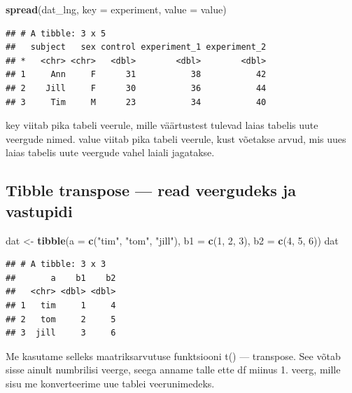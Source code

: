 \documentclass[]{book}
\newenvironment{Shaded}{\begin{snugshade}}{\end{snugshade}}
\newcommand{\KeywordTok}[1]{\textcolor[rgb]{0.13,0.29,0.53}{\textbf{#1}}}
\newcommand{\DataTypeTok}[1]{\textcolor[rgb]{0.13,0.29,0.53}{#1}}
\newcommand{\DecValTok}[1]{\textcolor[rgb]{0.00,0.00,0.81}{#1}}
\newcommand{\StringTok}[1]{\textcolor[rgb]{0.31,0.60,0.02}{#1}}
\newcommand{\NormalTok}[1]{#1}
\begin{document}
\begin{Shaded}
\begin{Highlighting}[]
\KeywordTok{spread}\NormalTok{(dat_lng, }\DataTypeTok{key =}\NormalTok{ experiment, }\DataTypeTok{value =}\NormalTok{ value)}
\end{Highlighting}
\end{Shaded}

\begin{verbatim}
## # A tibble: 3 x 5
##   subject   sex control experiment_1 experiment_2
## *   <chr> <chr>   <dbl>        <dbl>        <dbl>
## 1     Ann     F      31           38           42
## 2    Jill     F      30           36           44
## 3     Tim     M      23           34           40
\end{verbatim}

key viitab pika tabeli veerule, mille väärtustest tulevad laias tabelis
uute veergude nimed. value viitab pika tabeli veerule, kust võetakse
arvud, mis uues laias tabelis uute veergude vahel laiali jagatakse.

\subsection{Tibble transpose --- read veergudeks ja
vastupidi}\label{tibble-transpose-read-veergudeks-ja-vastupidi}

\begin{Shaded}
\begin{Highlighting}[]
\NormalTok{dat <-}\StringTok{ }\KeywordTok{tibble}\NormalTok{(}\DataTypeTok{a =} \KeywordTok{c}\NormalTok{(}\StringTok{"tim"}\NormalTok{, }\StringTok{"tom"}\NormalTok{, }\StringTok{"jill"}\NormalTok{), }\DataTypeTok{b1 =} \KeywordTok{c}\NormalTok{(}\DecValTok{1}\NormalTok{, }\DecValTok{2}\NormalTok{, }\DecValTok{3}\NormalTok{), }\DataTypeTok{b2 =} \KeywordTok{c}\NormalTok{(}\DecValTok{4}\NormalTok{, }\DecValTok{5}\NormalTok{, }\DecValTok{6}\NormalTok{))}
\NormalTok{dat}
\end{Highlighting}
\end{Shaded}

\begin{verbatim}
## # A tibble: 3 x 3
##       a    b1    b2
##   <chr> <dbl> <dbl>
## 1   tim     1     4
## 2   tom     2     5
## 3  jill     3     6
\end{verbatim}

Me kasutame selleks maatriksarvutuse funktsiooni t() --- transpose. See
võtab sisse ainult numbrilisi veerge, seega anname talle ette df miinus
1. veerg, mille sisu me konverteerime uue tablei veerunimedeks.
\end{document}
